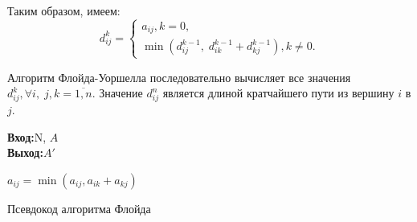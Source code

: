 \documentclass[a4paper,12pt]{report}
\renewcommand{\algorithmicrequire}{\textbf{Вход:}}
\renewcommand{\algorithmicensure}{\textbf{Выход:}}
\begin{document}
	\par Таким образом, имеем:
	$$d_{i j}^k = \begin{cases}
		a_{ij}, k =0,\\
		\min (d_{i j}^{k-1},\; d_{i k}^{k-1} + d_{k j}^{k-1}), k\ne 0.
		\end{cases}
$$

Алгоритм Флойда-Уоршелла последовательно вычисляет все значения $d_{i j}^{k}, \forall i,\; j, k = \overline{1,n}$. Значение $d_{ij}^n$ является длиной кратчайшего пути из вершину $i$ в $j$. 
\begin{algorithm}[H]
	\algorithmicrequire{N, $A$}\\
 	\algorithmicensure{$A'$}
	\begin{algorithmic}[1]
					\STATE $a_{ij} = \min(a_{ij}, a_{ik} + a_{kj})$
				\ENDFOR
			\ENDFOR
		\ENDFOR
	\end{algorithmic}
	\caption{Псевдокод алгоритма Флойда}
	\label{alg:seq}
\end{algorithm}
\end{document}
